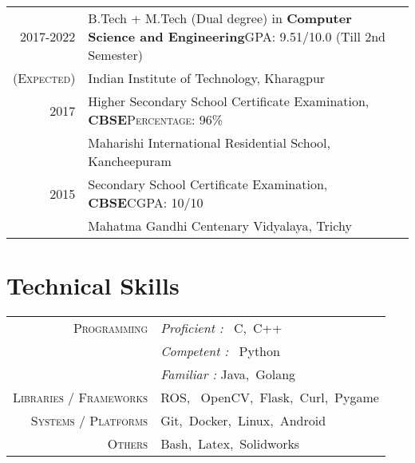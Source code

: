 \documentclass[a4paper,10pt]{extarticle} %
\begin{document}
\begin{tabular}{r|p{17.5cm}}	
2017-2022 & B.Tech + M.Tech (Dual degree) in \textbf{Computer Science and Engineering}\hfill\textsc{GPA: } 9.51/10.0 (Till 2nd Semester)\\
\textsc{(Expected)}& Indian Institute of Technology, Kharagpur \hfill\\
2017 & Higher Secondary School Certificate Examination, \textbf{CBSE}\hfill\textsc{Percentage: } 96\% \\
& Maharishi International Residential School, Kancheepuram \hfill\\
2015 & Secondary School Certificate Examination, \textbf{CBSE}\hfill\textsc{CGPA: } 10/10 \\
& Mahatma Gandhi Centenary Vidyalaya, Trichy \hfill\\
\end{tabular}

\vspace{0.2 cm}
\section{\textcolor{primary}{Technical Skills}}

\begin{tabular}{r|p{15cm}}
\textsc{Programming} & \textit{Proficient :} \ C,\ C++\\
& \textit{Competent :} \ Python \\
& \textit{Familiar :}  Java,\ Golang \\
\textsc{Libraries / Frameworks} & ROS, \ OpenCV,\ Flask,\ Curl,\ Pygame \\
\textsc{Systems / Platforms} & Git,\  Docker,\ Linux,\ Android\\
\textsc{Others} & Bash,\ Latex,\ Solidworks \\
\end{tabular}

\vspace{0.2cm}
\end{document}
